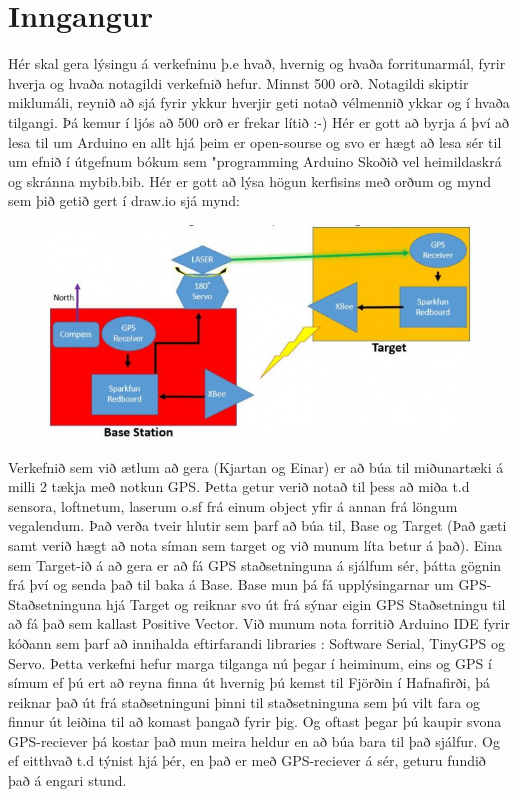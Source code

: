 \section{Inngangur}
Hér skal gera lýsingu á verkefninu þ.e hvað,  hvernig og  hvaða forritunarmál, fyrir hverja og hvaða notagildi verkefnið hefur. Minnst 500 orð. Notagildi skiptir miklumáli, reynið að sjá fyrir ykkur hverjir geti notað vélmennið ykkar og í hvaða tilgangi.  Þá kemur í ljós að 500 orð er frekar lítið :-) Hér er gott að byrja á því að lesa til um Arduino en allt hjá þeim er open-sourse og svo er hægt að lesa sér til um efnið í útgefnum bókum sem "programming Arduino \cite{monk} Skoðið vel heimildaskrá og skránna mybib.bib. Hér er gott að lýsa högun kerfisins með orðum og mynd sem þið getið gert í draw.io sjá mynd: 
\begin{figure}[h]
\includegraphics[scale=.3]{img/system}
\end{figure}

Verkefnið sem við ætlum að gera (Kjartan og Einar) er að búa til miðunartæki á milli 2 tækja með notkun GPS. Þetta getur verið notað til þess að miða t.d sensora, loftnetum, laserum o.sf frá einum object yfir á annan frá löngum vegalendum. Það verða tveir hlutir sem þarf að búa til, Base og Target (Það gæti samt verið hægt að nota síman sem target og við munum líta betur á það). Eina sem Target-ið á að gera er að fá GPS staðsetninguna á sjálfum sér, þátta gögnin frá því og senda það til baka á Base. Base mun þá fá upplýsingarnar um GPS-Staðsetninguna hjá Target og reiknar svo út frá sýnar eigin GPS Staðsetningu til að fá það sem kallast Positive Vector. Við munum nota forritið Arduino IDE fyrir kóðann sem þarf að innihalda eftirfarandi libraries : Software Serial, TinyGPS og Servo. Þetta verkefni hefur marga tilganga nú þegar í heiminum, eins og GPS í símum ef þú ert að reyna finna út hvernig þú kemst til Fjörðin í Hafnafirði, þá reiknar það út frá staðsetninguni þinni til staðsetninguna sem þú vilt fara og finnur út leiðina til að komast þangað fyrir þig. Og oftast þegar þú kaupir svona GPS-reciever þá kostar það mun meira heldur en að búa bara til það sjálfur. Og ef eitthvað t.d týnist hjá þér, en það er með GPS-reciever á sér, geturu fundið það á engari stund.
